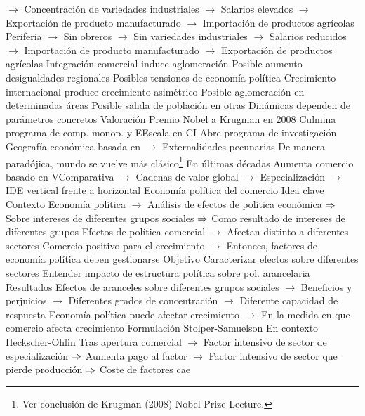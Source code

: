 \documentclass{nuevotema}
\begin{document}
\begin{esquemal}
				\4[] $\to$ Concentración de variedades industriales
				\4[] $\to$ Salarios elevados
				\4[] $\to$ Exportación de producto manufacturado
				\4[] $\to$ Importación de productos agrícolas
				\4[] Periferia
				\4[] $\to$ Sin obreros
				\4[] $\to$ Sin variedades industriales
				\4[] $\to$ Salarios reducidos
				\4[] $\to$ Importación de producto manufacturado
				\4[] $\to$ Exportación de productos agrícolas
				\4 Integración comercial induce aglomeración
				\4[] Posible aumento desigualdades regionales
				\4[] Posibles tensiones de economía política
				\4 Crecimiento internacional produce crecimiento asimétrico
				\4[] Posible aglomeración en determinadas áreas
				\4[] Posible salida de población en otras
				\4[] Dinámicas dependen de parámetros concretos
			\3 Valoración
				\4 Premio Nobel a Krugman en 2008
				\4[] Culmina programa de comp. monop. y EEscala en CI
				\4 Abre programa de investigación
				\4[] Geografía económica basada en
				\4[] $\to$ Externalidades pecunarias
				\4 De manera paradójica, mundo se vuelve más clásico\footnote{Ver conclusión de Krugman (2008) Nobel Prize Lecture.}
				\4[] En últimas décadas
				\4[] Aumenta comercio basado en VComparativa
				\4[] $\to$ Cadenas de valor global
				\4[] $\to$ Especialización
				\4[] $\to$ IDE vertical frente a horizontal
		\2 Economía política del comercio
			\3 Idea clave
				\4 Contexto
				\4[] Economía política
				\4[] $\to$ Análisis de efectos de política económica
				\4[] $\Rightarrow$ Sobre intereses de diferentes grupos sociales
				\4[] $\Rightarrow$ Como resultado de intereses de diferentes grupos
				\4[] Efectos de política comercial
				\4[] $\to$ Afectan distinto a diferentes sectores
				\4[] Comercio positivo para el crecimiento
				\4[] $\to$ Entonces, factores de economía política deben gestionarse
				\4 Objetivo
				\4[] Caracterizar efectos sobre diferentes sectores
				\4[] Entender impacto de estructura política sobre pol. arancelaria
				\4 Resultados
				\4[] Efectos de aranceles sobre diferentes grupos sociales
				\4[] $\to$ Beneficios y perjuicios
				\4[] $\to$ Diferentes grados de concentración
				\4[] $\to$ Diferente capacidad de respuesta
				\4[] Economía política puede afectar crecimiento
				\4[] $\to$ En la medida en que comercio afecta crecimiento
			\3 Formulación
				\4 Stolper-Samuelson
				\4[] En contexto Heckscher-Ohlin
				\4[] Tras apertura comercial
				\4[] $\to$ Factor intensivo de sector de especialización
				\4[] $\Rightarrow$ Aumenta pago al factor
				\4[] $\to$ Factor intensivo de sector que pierde producción
				\4[] $\Rightarrow$ Coste de factores cae

\end{esquemal}
\end{document}
